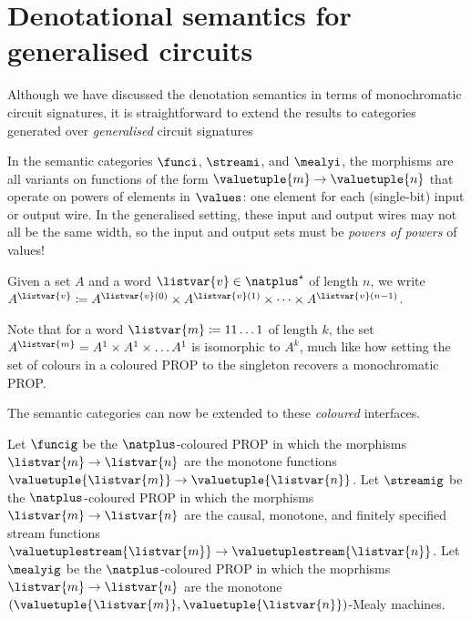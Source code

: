 \section{Denotational semantics for generalised circuits}

Although we have discussed the denotation semantics in terms of monochromatic
circuit signatures, it is straightforward to extend the results to categories
generated over \emph{generalised} circuit signatures

In the semantic categories \(\funci\), \(\streami\), and \(\mealyi\), the
morphisms are all variants on functions of the form
\(\valuetuple{m} \to \valuetuple{n}\) that operate on powers of elements in
\(\values\): one element for each (single-bit) input or output wire.
In the generalised setting, these input and output wires may not all be the
same width, so the input and output sets must be \emph{powers of powers} of
values!

\begin{notation}
    Given a set \(A\) and a word \(\listvar{v} \in \natplus^\star\) of
    length \(n\), we write \(
    A^{\listvar{v}}
    \coloneqq
    A^{\listvar{v}(0)}
    \times
    A^{\listvar{v}(1)}
    \times
    \dots
    \times
    A^{\listvar{v}(n-1)}
    \).
\end{notation}

Note that for a word \(\listvar{m} \coloneqq 11\dots1\) of length \(k\), the set
\(A^{\listvar{m}} = A^1 \times A^1 \times \dots A^1\) is isomorphic to \(A^k\),
much like how setting the set of colours in a coloured PROP to the singleton
recovers a monochromatic PROP.

The semantic categories can now be extended to these \emph{coloured} interfaces.

\begin{definition}
    Let \(\funcig\) be the \(\natplus\)-coloured PROP in which the morphisms
    \(\listvar{m} \to \listvar{n}\) are the monotone functions
    \(\valuetuple{\listvar{m}} \to \valuetuple{\listvar{n}}\).
    Let \(\streamig\) be the \(\natplus\)-coloured PROP in which the morphisms
    \(\listvar{m} \to \listvar{n}\) are the causal, monotone, and finitely
    specified stream functions \(
    \valuetuplestream{\listvar{m}} \to \valuetuplestream{\listvar{n}}
    \).
    Let \(\mealyig\) be the \(\natplus\)-coloured PROP in which the moprhisms
    \(\listvar{m} \to \listvar{n}\) are the monotone
    \((\valuetuple{\listvar{m}}, \valuetuple{\listvar{n}})\)-Mealy machines.
\end{definition}

